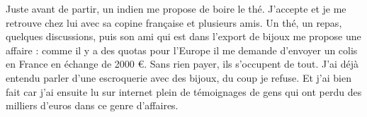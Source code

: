  \newline
 Juste avant de partir, un indien me propose de boire le thé. J'accepte et je me retrouve chez lui avec sa copine française et plusieurs amis. Un thé, un repas, quelques discussions, puis son ami qui est dans l'export de bijoux me propose une affaire : comme il y a des quotas pour l'Europe il me demande d'envoyer un colis en France en échange de 2000 €. Sans rien payer, ils s'occupent de tout. \newline
 J'ai déjà entendu parler d'une escroquerie avec des bijoux, du coup je refuse. \newline
 Et j'ai bien fait car j'ai ensuite lu sur internet plein de témoignages de gens qui ont perdu des milliers d'euros dans ce genre d'affaires. \newline

\newpage
 
